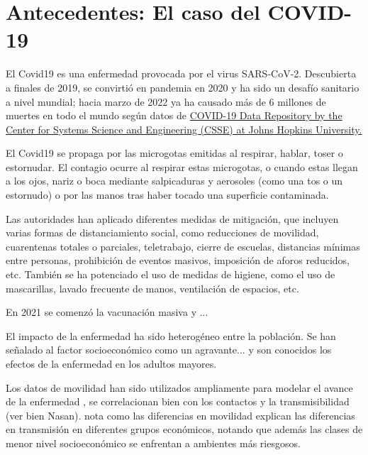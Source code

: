 \section{Antecedentes: El caso del COVID-19} \label{sec:antecedentes}

El Covid19 es una enfermedad provocada por el virus SARS-CoV-2. Descubierta a finales de 2019, se convirtió en pandemia en 2020 y ha sido un desafío sanitario a nivel mundial; hacia marzo de 2022 ya ha causado más de 6 millones de muertes en todo el mundo según datos de \href{https://ourworldindata.org/explorers/coronavirus-data-explorer?facet=none&pickerSort=desc&pickerMetric=total_cases&Metric=Confirmed+deaths&Interval=Cumulative&Relative+to+Population=false&Color+by+test+positivity=false&country=~OWID_WRL}{COVID-19 Data Repository by the Center for Systems Science and Engineering (CSSE) at Johns Hopkins University.} 

El Covid19 se propaga por las microgotas emitidas al respirar, hablar, toser o estornudar. El contagio ocurre al respirar estas microgotas, o cuando estas llegan a los ojos, nariz o boca mediante salpicaduras y aerosoles (como una tos o un estornudo) o por las manos tras haber tocado una superficie contaminada.

Las autoridades han aplicado diferentes medidas de mitigación, que incluyen varias formas de distanciamiento social, como reducciones de movilidad, cuarentenas totales o parciales, teletrabajo, cierre de escuelas, distancias mínimas entre personas, prohibición de eventos masivos, imposición de aforos reducidos, etc. También se ha potenciado el uso de medidas de higiene, como el uso de mascarillas, lavado frecuente de manos, ventilación de espacios, etc.

En 2021 se comenzó la vacunación masiva y ...

El impacto de la enfermedad ha sido heterogéneo entre la población. Se han señalado al factor socioeconómico \cite{Ahmed2020} como un agravante... y son conocidos los efectos de la enfermedad en los adultos mayores.

Los datos de movilidad han sido utilizados ampliamente para modelar el avance de la enfermedad \cite{Lai2020}\cite{Oliver2020}, se correlacionan bien con los contactos \cite{Prem2020} y la transmisibilidad \cite{Nasan2021} (ver bien Nasan). \cite{Chang2021} nota como las diferencias en movilidad explican las diferencias en transmisión en diferentes grupos económicos, notando que además las clases de menor nivel socioeconómico se enfrentan a ambientes más riesgosos.

